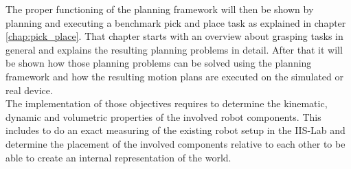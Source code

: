 The proper functioning of the planning framework will then be shown by planning and executing a benchmark pick and place task as explained in chapter \ref{chap:pick_place}. That chapter starts with an overview about grasping tasks in general and explains the resulting planning problems in detail. After that it will be shown how those planning problems can be solved using the planning framework and how the resulting motion plans are executed on the simulated or real device.\\

The implementation of those objectives requires to determine the kinematic, dynamic and volumetric properties of the involved robot components. This includes to do an exact measuring of the existing robot setup in the IIS-Lab and determine the placement of the involved components relative to each other to be able to create an internal representation of the world. 

